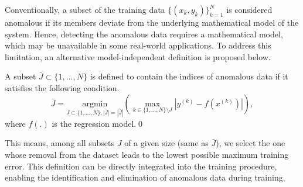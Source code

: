 \documentclass[smallextended,referee,envcountsect,,numbers]{svjour3}
\begin{document}
Conventionally, a subset of the training data $\{(x_k,y_k)\}_{k=1}^{N}$ is considered anomalous if its members deviate from the underlying mathematical model of the system. Hence, detecting the anomalous data requires a mathematical model, which may be unavailable in some real-world applications. To address this limitation, an alternative model-independent definition is proposed below.
\begin{definition} \label{def:ad}
A subset $\bar{J}\subset \{1,...,N\}$ is defined to contain the indices of anomalous data if it satisfies the following condition.
\begin{equation} \label{eq3}
    \bar{J}=\underset{J \subset \{1,...,N\},|J|=|\bar{J}|}{\text{argmin}} \left(\max_{k\in \{1,...,N\} \setminus J} {\left|y^{\left(k\right)}-f(x^{(k)})\right|}\right),
\end{equation}
where $f(.)$ is the regression model.\qed
\end{definition}
This means, among all subsets $J$ of a given size (same as 
$\bar{J}$), we select the one whose removal from the dataset leads to the lowest possible maximum training error. This definition can be directly integrated into the training procedure, enabling the identification and elimination of anomalous data during training. 
\end{document}
